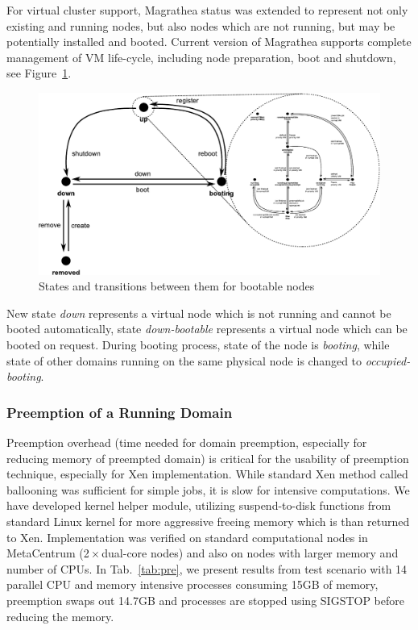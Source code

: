 \documentclass[a4paper]{article}
\begin{document}
For virtual cluster support, Magrathea status was extended 
to represent not only existing and running nodes, but also nodes which are not running, but may be potentially 
installed and booted. Current version of Magrathea supports complete management of VM life-cycle, including 
node preparation, boot and shutdown, see Figure~\ref{fig:lifecycle}.

\begin{figure}[htb]
\begin{center}
    \includegraphics[width=\columnwidth]{lifecycle2}
    \caption{States and transitions between them for bootable nodes}
    \label{fig:lifecycle}
\end{center}
\end{figure}

New state \textit{down} represents a virtual node which is not running and cannot be booted automatically, state
\textit{down-bootable} represents a virtual node which can be booted on request. During booting
process, state of the node is \textit{booting}, while state of other domains running on the same physical node is 
changed to \textit{occupied-booting}.

\subsubsection{Preemption of a Running Domain}

Preemption overhead (time needed for domain preemption, especially for reducing memory of preempted domain)
is critical for the usability of preemption technique, especially for Xen implementation.
While standard Xen method called ballooning was sufficient for simple jobs, it is slow 
for intensive computations.  We have developed kernel helper module, utilizing suspend-to-disk 
functions from standard Linux kernel for more aggressive freeing memory which is than returned to Xen.
Implementation was verified on standard computational nodes in MetaCentrum
(2${}\times{}$dual-core nodes)
and also on nodes with larger memory and number of CPUs. In
Tab.~\ref{tab:pre}, we present results
from test scenario with 14 parallel CPU and memory intensive processes consuming 15GB of
memory, preemption swaps out 14.7GB and processes are stopped using SIGSTOP before
reducing the memory.
\end{document}
